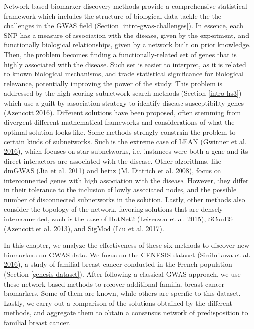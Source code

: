 \documentclass[
  11pt,
]{env/yjiao}
\begin{document}
Network-based biomarker discovery methods provide a comprehensive
statistical framework which includes the structure of biological data
tackle the the challenges in the GWAS field
(Section \ref{intro-gwas-challenges}). In essence, each SNP has a measure of
association with the disease, given by the experiment, and functionally
biological relationships, given by a network built on prior knowledge.
Then, the problem becomes finding a functionally-related set of genes
that is highly associated with the disease. Such set is easier to
interpret, as it is related to known biological mechanisms, and trade
statistical significance for biological relevance, potentially improving
the power of the study. This problem is addressed by the high-scoring
subnetwork search methods (Section \ref{intro-hs3}) which use a
guilt-by-association strategy to identify disease
susceptibility genes (Azencott \protect\hyperlink{ref-azencott_network-guided_2016}{2016}).
Different solutions have been proposed, often stemming from divergent different
mathematical frameworks and considerations of what the optimal solution
looks like. Some methods strongly constrain the problem to certain kinds
of subnetworks. Such is the extreme case of LEAN
(Gwinner et al. \protect\hyperlink{ref-gwinner_network-based_2016}{2016}), which focuses on star subnetworks, i.e.
instances were both a gene and its direct interactors are associated
with the disease. Other algorithms, like dmGWAS (Jia et al. \protect\hyperlink{ref-jia_dmgwas:_2011}{2011}) and
heinz (M. Dittrich et al. \protect\hyperlink{ref-dittrich_identifying_2008}{2008}), focus on interconnected genes with
high association with the disease. However, they differ in their
tolerance to the inclusion of lowly associated nodes, and the possible
number of disconnected subnetworks in the solution. Lastly, other
methods also consider the topology of the network, favoring solutions
that are densely interconnected; such is the case of HotNet2
(Leiserson et al. \protect\hyperlink{ref-leiserson_pan-cancer_2015}{2015}), SConES (Azencott et al. \protect\hyperlink{ref-azencott_efficient_2013}{2013}), and
SigMod (Liu et al. \protect\hyperlink{ref-liu_sigmod:_2017}{2017}).

In this chapter, we analyze the effectiveness of these six methods to
discover new biomarkers on GWAS data. We focus on the GENESIS dataset
(Sinilnikova et al. \protect\hyperlink{ref-sinilnikova_genesis:_2016}{2016}), a study of familial breast cancer
conducted in the French population (Section \ref{genesis-dataset}).
After following a classical GWAS
approach, we use these network-based methods to recover additional
familial breast cancer biomarkers. Some of them are known, while others
are specific to this dataset. Lastly, we carry out a comparison of the
solutions obtained by the different methods, and aggregate them to
obtain a consensus network of predisposition to familial breast cancer.
\end{document}
